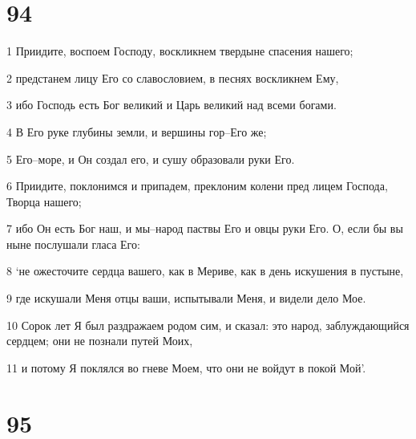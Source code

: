 \chapter{94}

\par 1 Приидите, воспоем Господу, воскликнем твердыне спасения нашего;
\par 2 предстанем лицу Его со славословием, в песнях воскликнем Ему,
\par 3 ибо Господь есть Бог великий и Царь великий над всеми богами.
\par 4 В Его руке глубины земли, и вершины гор--Его же;
\par 5 Его--море, и Он создал его, и сушу образовали руки Его.
\par 6 Приидите, поклонимся и припадем, преклоним колени пред лицем Господа, Творца нашего;
\par 7 ибо Он есть Бог наш, и мы--народ паствы Его и овцы руки Его. О, если бы вы ныне послушали гласа Его:
\par 8 `не ожесточите сердца вашего, как в Мериве, как в день искушения в пустыне,
\par 9 где искушали Меня отцы ваши, испытывали Меня, и видели дело Мое.
\par 10 Сорок лет Я был раздражаем родом сим, и сказал: это народ, заблуждающийся сердцем; они не познали путей Моих,
\par 11 и потому Я поклялся во гневе Моем, что они не войдут в покой Мой'.

\chapter{95}


